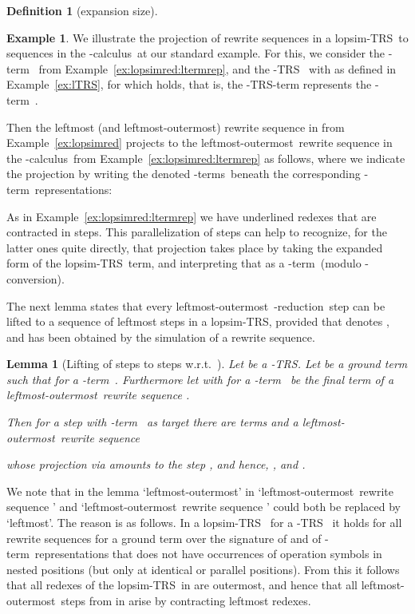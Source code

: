 \documentclass[
submission
]{dmtcs-episciences-tampered}
\newcommand{\nb}{\nobreakdash}
\newcommand{\TRS}{TRS}
\newcommand{\lopsimTRS}{lopsim-TRS}
\newcommand{\lambdacalculus}{\nb-cal\-cu\-lus}
\newcommand{\lambdaterm}{\nb-term}
\newcommand{\lambdaterms}{\lambdaterm{s}}
\newcommand{\betareduction}{\nb-re\-duc\-tion}
\newcommand{\alphaconversion}{\nb-con\-ver\-sion}
\newcommand{\lo}{left\-most-outer\-most}
\newcommand{\lTRS}{\hspace*{-0.5pt}\nb-\hspace*{-0.5pt}\TRS}
\theoremstyle{plain}
\newtheorem{lemma}[theorem]{Lemma}
\theoremstyle{definition}
\newtheorem{definition}[theorem]{Definition}
\newtheorem{example}[theorem]{Example}
\begin{document}
\begin{definition}[expansion size]
{\begin{example}
  We illustrate the projection of  rewrite sequences in a \lopsimTRS\ to  sequences in the \lambdacalculus\
  at our standard example.
  For this, we consider the \lambdaterm~
  from Example~\ref{ex:lopsimred:ltermrep}, and the \lTRS~
  with 
  as defined in Example~\ref{ex:lTRS}, for which  holds, 
  that is, the \lTRS\nb-term  represents the \lambdaterm~.  
  
  Then the leftmost (and \lo)  rewrite sequence in  from Example~\ref{ex:lopsimred} 
  projects to the \lo\  rewrite sequence in the \lambdacalculus\ from Example~\ref{ex:lopsimred:ltermrep}
  as follows, where we indicate the projection by writing the denoted \lambdaterms\ beneath 
  the corresponding \lambdaterm\ representations:
  \begin{center}
  
  \end{center}
  As in Example~\ref{ex:lopsimred:ltermrep} we have underlined redexes that are contracted in  steps.
  This parallelization of steps can help to recognize, for the latter ones quite directly,
  that projection takes place by taking the expanded form of the \lopsimTRS\ term, and interpreting that as a \lambdaterm\
  (modulo \alphaconversion).\label{ex:prop:projection}
\end{example}






The next lemma states that every \lo\ \betareduction\ step 
can be lifted to a sequence  of leftmost steps in a \lopsimTRS,
provided that  denotes , and  has been obtained by the simulation of a  rewrite sequence. 


\begin{lemma}[Lifting of  steps to  steps w.r.t.\ ]\label{lem:lifting}
  Let  be a \lTRS.
  Let  be a ground term 
  such that  for a \lambdaterm~.
  Furthermore let  
  with  for a \lambdaterm~
  be the final term of a \lo\ rewrite sequence .
  
  Then for a  step  
  with \lambdaterm~ as target
  there are terms  
  and a \lo\  rewrite sequence 
  
  whose projection via  amounts to the step ,
  and hence, , and .
\end{lemma}

We note that in the lemma `\lo' in `\lo\ rewrite sequence '
and `\lo\  rewrite sequence '
could both be replaced by `leftmost'. The reason is as follows. 
In a \lopsimTRS~ for a \lTRS~ 
it holds for all rewrite sequences  for a ground term  over the signature of 
and of \lambdaterm\ representations that  does not have occurrences of operation symbols  in nested positions
(but only at identical or parallel positions). 
From this it follows that all redexes of the \lopsimTRS\ in  are outermost,
and hence that all \lo\ steps from  in  arise by contracting leftmost redexes. 

}
\end{definition}
\end{document}
